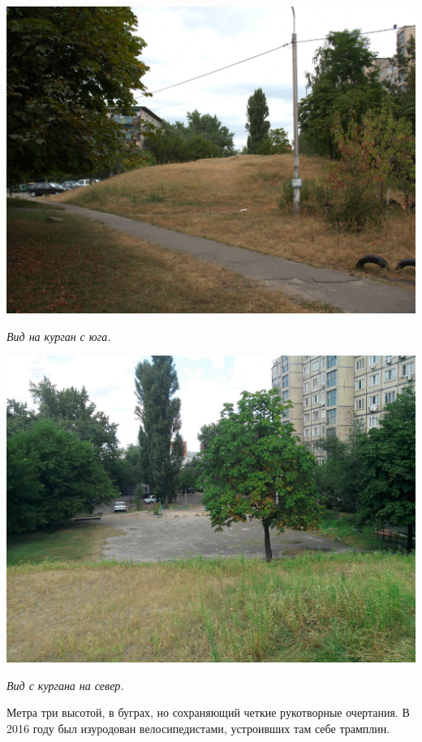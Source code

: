 \begin{center}
\includegraphics[width=\linewidth]{chast-gorodki/kurgany/s_CRW_3894.jpg}

\textit{Вид на курган с юга.}
\end{center}


\begin{center}
\includegraphics[width=\linewidth]{chast-gorodki/kurgany/s_IMG_20140806_125336.jpg}

\textit{Вид с кургана на север.}
\end{center}

Метра три высотой, в буграх, но сохраняющий четкие рукотворные очертания. В 2016 году был изуродован велосипедистами, устроивших там себе трамплин.

